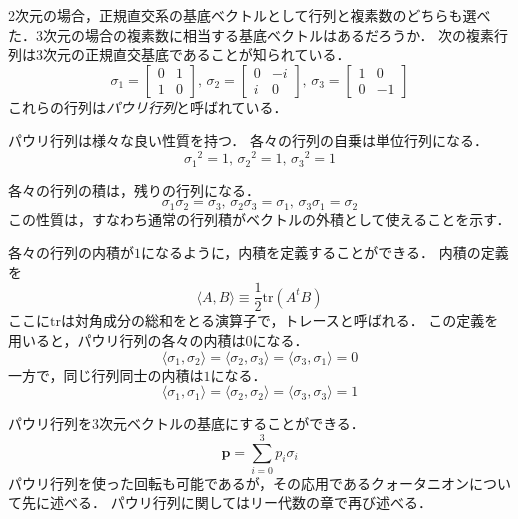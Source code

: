 \documentclass{jsbook}
\newcommand{\keyword}[1]{\emph{#1}}
\newcommand{\bvec}[1]{\boldsymbol{#1}}
\newcommand{\One}{1}%
\newcommand{\im}{i}%
\newcommand{\tr}{\mathrm{tr}}
\begin{document}
2次元の場合，正規直交系の基底ベクトルとして行列と複素数のどちらも選べた．3次元の場合の複素数に相当する基底ベクトルはあるだろうか．
次の複素行列は3次元の正規直交基底であることが知られている．
\begin{equation}
\sigma_1=\begin{bmatrix}0&1\\1&0\end{bmatrix},\,
\sigma_2=\begin{bmatrix}0&-\im\\\im&0\end{bmatrix},\,
\sigma_3=\begin{bmatrix}1&0\\0&-1\end{bmatrix}
\end{equation}
これらの行列は\keyword{パウリ行列}と呼ばれている．

パウリ行列は様々な良い性質を持つ．
各々の行列の自乗は単位行列になる．
\begin{equation}
{\sigma_1}^2=\One,\,
{\sigma_2}^2=\One,\,
{\sigma_3}^2=\One
\end{equation}

各々の行列の積は，残りの行列になる．
\begin{equation}
\sigma_1\sigma_2=\sigma_3,\,
\sigma_2\sigma_3=\sigma_1,\,
\sigma_3\sigma_1=\sigma_2
\end{equation}
この性質は，すなわち通常の行列積がベクトルの外積として使えることを示す．

各々の行列の内積が$1$になるように，内積を定義することができる．
内積の定義を
\begin{equation}
\langle A,B\rangle\equiv\frac{1}{2}\tr \left(A^tB\right)
\end{equation}
ここに$\tr$は対角成分の総和をとる演算子で，トレースと呼ばれる．
この定義を用いると，パウリ行列の各々の内積は$0$になる．
\begin{equation}
\langle\sigma_1,\sigma_2\rangle=\langle\sigma_2,\sigma_3\rangle=\langle\sigma_3,\sigma_1\rangle=0
\end{equation}
一方で，同じ行列同士の内積は$1$になる．
\begin{equation}
\langle\sigma_1,\sigma_1\rangle=\langle\sigma_2,\sigma_2\rangle=\langle\sigma_3,\sigma_3\rangle=1
\end{equation}

パウリ行列を3次元ベクトルの基底にすることができる．
\begin{equation}
\bvec{p}=\sum_{i=0}^3p_i\sigma_i
\end{equation}
パウリ行列を使った回転も可能であるが，その応用であるクォータニオンについて先に述べる．
パウリ行列に関してはリー代数の章で再び述べる．
\end{document}
